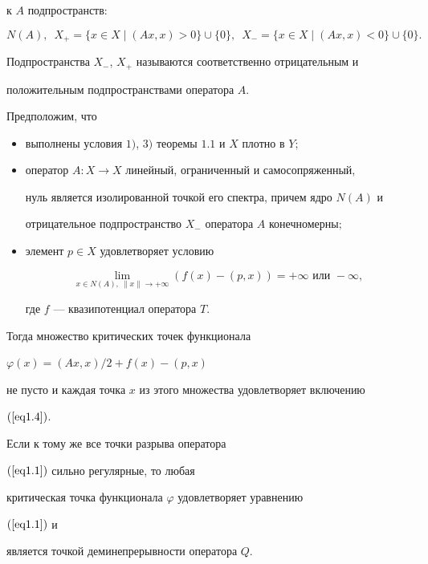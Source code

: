 к $A$ подпространств:


$$


N(A),\ \; X_{+}=\{x\in X\mid (Ax,x)>0\}\cup \{0\},\ \;


X_{-}=\{x \in X\mid(Ax,x)<0\}\cup \{0\}.


$$


Подпространства $X_{-}$, $X_{+}$ называются соответственно отрицательным и


положительным подпространствами оператора $A$.





\begin{thms} Предположим, что


\begin{itemize}


\item[1)] выполнены условия $1)$, $3)$ теоремы $1.1$ и $X$ плотно в $Y;$


\item[2)] оператор $A: X \to X$ линейный, ограниченный и самосопряженный,


нуль является изолированной точкой его спектра, причем ядро $N(A)$ и


отрицательное подпространство $X_{-}$ оператора $A$ конечномерны\/$;$


\item[3)] элемент $p \in X$ удовлетворяет условию


\begin{equation}


\lim\limits_{x\in N(A),\ \|x\|\to +\infty}(f(x)-(p,x))=+\infty


\text{ или } -\infty,\label{eq1.5}


\end{equation}


где $f$ --- квазипотенциал оператора $T$.


\end{itemize}


Тогда множество критических точек функционала


$\varphi(x)=(Ax,x)/2+f(x)-(p,x)$


не пусто и каждая точка $x$ из этого множества удовлетворяет включению


$(\ref{eq1.4})$.





Если к тому же все точки разрыва оператора


$(\ref{eq1.1})$ сильно регулярные, то любая


критическая точка функционала $\varphi$ удовлетворяет уравнению


$(\ref{eq1.1})$ и


является точкой деминепрерывности оператора $Q$.


\end{thms}





